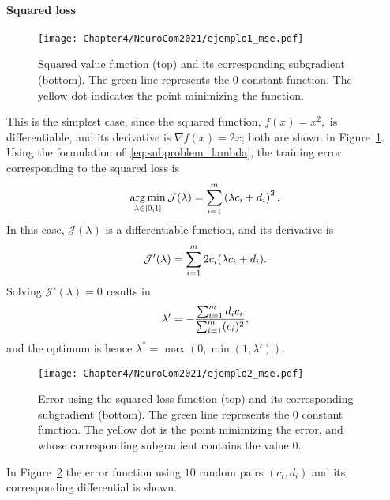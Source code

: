 \paragraph*{Squared loss\\}
\begin{figure}[t!]
    \centering
    \texttt{[image: Chapter4/NeuroCom2021/ejemplo1\_mse.pdf]}
    \caption{Squared value function (top) and its corresponding subgradient (bottom). The green line represents the $0$ constant function. The yellow dot indicates the point minimizing the function.}
    \label{fig:sq_loss}
\end{figure}
This is the simplest case, since the squared function,
$f(x) = x^2 ,$
is differentiable, and its derivative is 
$\nabla f(x) = 2x$; both are shown in Figure~\ref{fig:sq_loss}.
Using the formulation of~\eqref{eq:subproblem_lambda}, the training error corresponding to the squared loss is
\begin{equation}
    \label{eq:opt_sq}
    \argmin_{\lambda \in [0, 1]} \mathcal{J}(\lambda) = \sum_{i=1}^{\npertask} \left({\lambda c_i + d_i}\right)^2 .
\end{equation}
In this case, $\mathcal{J}(\lambda)$ is a differentiable function, and its derivative is 
\begin{equation}
    \nonumber
    \mathcal{J}'(\lambda) = \sum_{i=1}^m 2 c_i (\lambda c_i + d_i) .
\end{equation}
Solving $\mathcal{J}'(\lambda)= 0$ results in
%
\begin{equation*}
\lambda' =  -\frac{\sum_{i=1}^{m} d_i c_i }{\sum_{i=1}^{m} (c_i)^2 } ,
\end{equation*}
and the optimum is hence $\lambda^* = \max(0, \min(1, \lambda'))$.
\begin{figure}[t!]
    \centering
    \texttt{[image: Chapter4/NeuroCom2021/ejemplo2\_mse.pdf]}
    \caption{Error using the squared loss function (top) and its corresponding subgradient (bottom). The green line represents the $0$ constant function. The yellow dot is the point minimizing the error, and whose corresponding subgradient contains the value $0$.}
    \label{fig:sq_error}
\end{figure}

In Figure~\ref{fig:sq_error} the error function using $10$ random pairs $(c_i, d_i)$ and its corresponding differential is shown.

